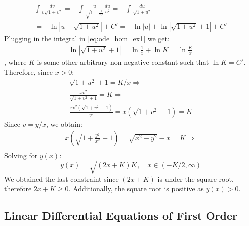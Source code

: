 \documentclass[a4paper]{article}
\begin{document}
\begin{soln}
    \begin{gather*}
        \int \frac{dv}{v\sqrt{1+v^2}} = -\int \frac{u}{\sqrt{1+ \tfrac{1}{u^2}}} \frac{du}{u^2}  = - \int \frac{du}{\sqrt{1+u^2}}  \\
        = -\ln \left|u + \sqrt{1+u^2} \right| + C' = -\ln\left|u\right| + \ln\left|\sqrt{1+u^2} + 1 \right| + C'
    \end{gather*}
    Plugging in the integral in \eqref{eq:ode_hom_ex1} we get:
    \begin{gather*}
        \ln\left|\sqrt{1+u^2} + 1 \right| = \ln \frac{1}{x} + \ln{K} = \ln \frac{K}{x}
    \end{gather*}
    , where $K$ is some other arbitrary non-negative constant such that $\ln K = C'$. Therefore, since $x>0$:
    \begin{gather*}
        \sqrt{1+u^2} + 1 = K/x \Rightarrow \\ 
        \frac{xv^2}{\sqrt{1+v^2} + 1} = K  \Rightarrow \\
        \frac{xv^2(\sqrt{1+v^2} - 1)}{v^2} = x(\sqrt{1+v^2} - 1) = K
    \end{gather*}
    Since $v = y/x$, we obtain:
    \begin{gather*}
        x\left(\sqrt{1+\tfrac{y^2}{x^2}} - 1\right) = \sqrt{x^2 - y^2} - x = K \Rightarrow \\
    \end{gather*}
    Solving for $y(x)$:
    \[
        y(x) = \sqrt{(2x+K)K}, \quad x\in (-K/2, \infty)
    \]
    We obtained the last constraint since $(2x+K)$ is under the square root, therefore $2x+K\geq 0$. Additionally, the square root is positive as $y(x) > 0$.
\end{soln}



\subsection{Linear Differential Equations of First Order}
\end{document}
